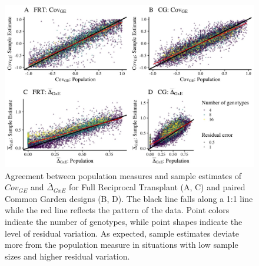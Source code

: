 \documentclass[11pt, oneside]{amsart}
\begin{document}
\clearpage
\newpage

\renewcommand{\figurename}{Supplementary Figure}

\renewcommand\thefigure{S2}
\begin{figure}[h]
\begin{center}
\includegraphics[width=6in]{SampleVsPopulation.jpeg}
\end{center}
\label{Fig: Population vs. Sample Estimates}
\caption{Agreement between population measures and sample estimates of $Cov_{GE}$ and $\bar\Delta_{GxE}$ for Full Reciprocal Transplant (A, C) and paired Common Garden designs (B, D). The black line falls along a 1:1 line while the red line reflects the pattern of the data. Point colors indicate the number of genotypes, while point shapes indicate the level of residual variation. As expected, sample estimates deviate more from the population measure in situations with low sample sizes and higher residual variation.}
\end{figure}
\end{document}
